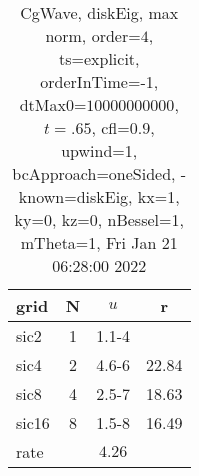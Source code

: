 \begin{table}[H]\tableFont %
\begin{center}
\begin{tabular}{|l|c|c|c|} \hline 
grid  & N &  $ u $ & r \\ \hline 
      sic2 &     1 & \num{1.1}{-4} &        \\ \hline
      sic4 &     2 & \num{4.6}{-6} & 22.84  \\ \hline
      sic8 &     4 & \num{2.5}{-7} & 18.63  \\ \hline
     sic16 &     8 & \num{1.5}{-8} & 16.49  \\ \hline
    rate             &       &  $4.26$       &       \\ \hline
\end{tabular}
\caption{CgWave, diskEig, max norm, order=$4$, ts=explicit, orderInTime=-1, dtMax0=$10000000000$, $t=.65$, cfl=$0.9$, upwind=1, bcApproach=oneSided, -known=diskEig, kx=1, ky=0, kz=0, nBessel=1, mTheta=1, Fri Jan 21 06:28:00 2022}\label{table:diskEigOrder4max}
\end{center}
\end{table}
